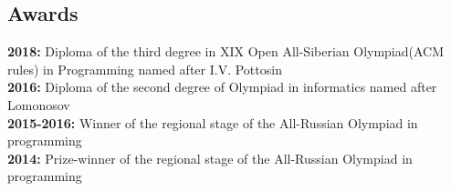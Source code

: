 \documentclass[margin,line,a4paper]{resume}
\begin{document}
\begin{resume}
\section{\mysidestyle Awards}
    \textbf{2018:} Diploma of the third degree in XIX Open All-Siberian Olympiad(ACM rules) in Programming named after I.V. Pottosin\\
    \textbf{2016:} Diploma of the second degree of Olympiad in informatics named after Lomonosov\\
    \textbf{2015-2016:} Winner of the regional stage of the All-Russian Olympiad in programming\\
    \textbf{2014:} Prize-winner of the regional stage of the All-Russian Olympiad in programming\\
\end{resume}
\end{document}
